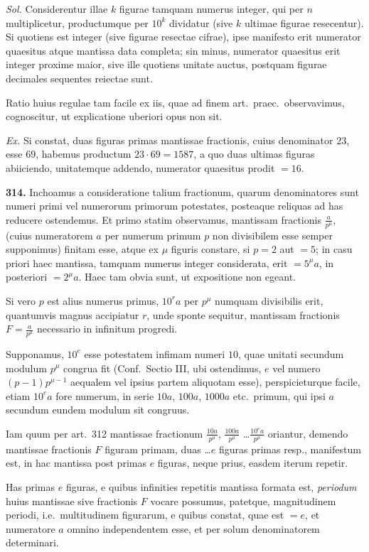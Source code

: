 \documentclass[12pt,a4paper]{article}
\theoremstyle{plain}
\theoremstyle{definition}
\theoremstyle{remark}
\begin{document}
\textit{Sol.} Considerentur illae $k$ figurae tamquam numerus integer, qui per $n$ multiplicetur, productumque per $10^k$ dividatur (sive $k$ ultimae figurae resecentur). Si quotiens est integer (sive figurae resectae cifrae), ipse manifesto erit numerator quaesitus atque mantissa data completa; sin minus, numerator quaesitus erit integer proxime maior, sive ille quotiens unitate auctus, postquam figurae decimales sequentes reiectae sunt.

Ratio huius regulae tam facile ex iis, quae ad finem art.~praec.~observavimus, cognoscitur, ut explicatione uberiori opus non sit.

\textit{Ex.} Si constat, duas figuras primas mantissae fractionis, cuius denominator $23$, esse $69$, habemus productum $23 \cdot 69 = 1587$, a quo duas ultimas figuras abiiciendo, unitatemque addendo, numerator quaesitus prodit $= 16$.

\textbf{314.} Inchoamus a consideratione talium fractionum, quarum denominatores sunt numeri primi vel numerorum primorum potestates, posteaque reliquas ad has reducere ostendemus. Et primo statim observamus, mantissam fractionis $\frac{a}{p^\mu}$, (cuius numeratorem $a$ per numerum primum $p$ non divisibilem esse semper supponimus) finitam esse, atque ex $\mu$ figuris constare, si $p = 2$ aut $= 5$; in casu priori haec mantissa, tamquam numerus integer considerata, erit $= 5^\mu a$, in posteriori $= 2^\mu a$. Haec tam obvia sunt, ut expositione non egeant.

Si vero $p$ est alius numerus primus, $10^r a$ per $p^\mu$ numquam divisibilis erit, quantumvis magnus accipiatur $r$, unde sponte sequitur, mantissam fractionis $F = \frac{a}{p^\mu}$ necessario in infinitum progredi.

Supponamus, $10^e$ esse potestatem infimam numeri $10$, quae unitati secundum modulum $p^\mu$ congrua fit (Conf.~Sectio III, ubi ostendimus, $e$ vel numero $(p-1)p^{\mu-1}$ aequalem vel ipsius partem aliquotam esse), perspicieturque facile, etiam $10^e a$ fore numerum, in serie $10a$, $100a$, $1000a$ etc.~primum, qui ipsi $a$ secundum eundem modulum sit congruus.

Iam quum per art.~312 mantissae fractionum $\frac{10a}{p^\mu}$, $\frac{100a}{p^\mu}$ \ldots $\frac{10^e a}{p^\mu}$ oriantur, demendo mantissae fractionis $F$ figuram primam, duas \ldots $e$ figuras primas resp., manifestum est, in hac mantissa post primas $e$ figuras, neque prius, easdem iterum repetir.

Has primas $e$ figuras, e quibus infinities repetitis mantissa formata est, \textit{periodum} huius mantissae sive fractionis $F$ vocare possumus, patetque, magnitudinem periodi, i.e.~multitudinem figurarum, e quibus constat, quae est $= e$, et numeratore $a$ omnino independentem esse, et per solum denominatorem determinari.
\end{document}
